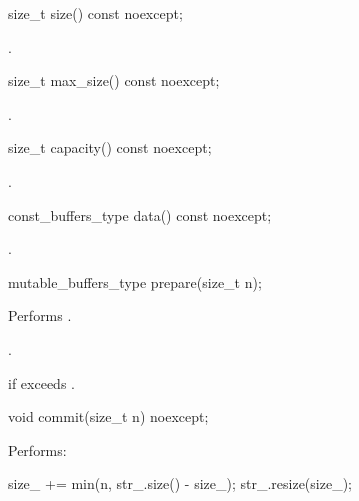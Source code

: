 \begin{itemdecl}
size_t size() const noexcept;
\end{itemdecl}

\begin{itemdescr}
\pnum
\returns {}.
\end{itemdescr}

\begin{itemdecl}
size_t max_size() const noexcept;
\end{itemdecl}

\begin{itemdescr}
\pnum
\returns {}.
\end{itemdescr}

\begin{itemdecl}
size_t capacity() const noexcept;
\end{itemdecl}

\begin{itemdescr}
\pnum
\returns {}.
\end{itemdescr}

\begin{itemdecl}
const_buffers_type data() const noexcept;
\end{itemdecl}

\begin{itemdescr}
\pnum
\returns {}.
\end{itemdescr}

\begin{itemdecl}
mutable_buffers_type prepare(size_t n);
\end{itemdecl}

\begin{itemdescr}
\pnum
\effects Performs .

\pnum
\returns {}.

\pnum
\remarks {} if  exceeds .
\end{itemdescr}

\begin{itemdecl}
void commit(size_t n) noexcept;
\end{itemdecl}

\begin{itemdescr}
\pnum
\effects Performs:
\begin{codeblock}
size_ += min(n, str_.size() - size_);
str_.resize(size_);
\end{codeblock}

\end{itemdescr}

